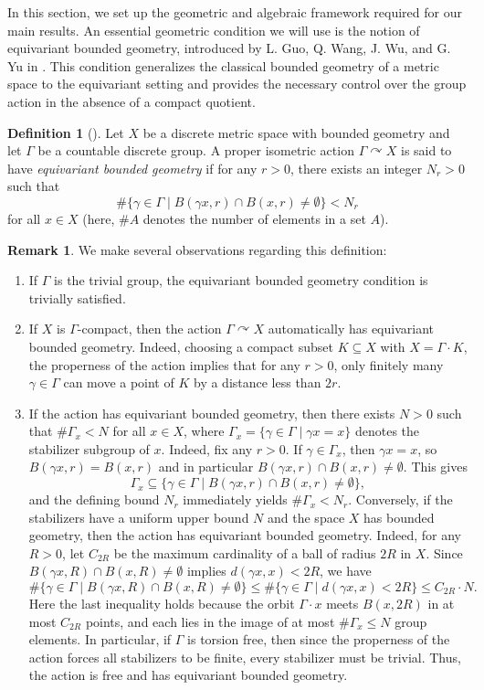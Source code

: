 \documentclass[pdflatex]{sn-jnl}
\theoremstyle{plain}
\theoremstyle{definition}
\newtheorem{definition}[theorem]{Definition}
\newtheorem{remark}[theorem]{Remark}
\begin{document}
In this section, we set up the geometric and algebraic framework required for our main results.
An essential geometric condition we will use is the notion of equivariant bounded geometry, introduced by L. Guo, Q. Wang, J. Wu, and G. Yu in \cite{GWWY24}. This condition generalizes the classical bounded geometry of a metric space to the equivariant setting and provides the necessary control over the group action in the absence of a compact quotient. 
\begin{definition}[\cite{GWWY24}]\label{def:equiv-bdd-geom}
Let $X$ be a discrete metric space with bounded geometry and let $\Gamma$ be a countable discrete group. A proper isometric action $\Gamma \curvearrowright X$ is said to have \textit{equivariant bounded geometry} if for any $r>0$, there exists an integer $N_r>0$ such that
\[\#\{\gamma\in\Gamma\mid B(\gamma x,r)\cap B(x,r)\neq\emptyset\}<N_{r}\]
for all $x\in X$ (here, $\#A$ denotes the number of elements in a set $A$).
\end{definition}
\begin{remark}\label{rem:equivariant-bounded-geometry}
We make several observations regarding this definition:
\begin{enumerate}
\item[(1)] If $\Gamma$ is the trivial group, the equivariant bounded geometry condition is trivially satisfied. 
\item [(2)] If $X$ is $\Gamma$-compact, then the action $\Gamma \curvearrowright X$ automatically has equivariant bounded geometry. Indeed, choosing a compact subset $K \subseteq X$ with $X=\Gamma\cdot K$, the properness of the action implies that for any $r>0$, only finitely many $\gamma\in\Gamma$ can move a point of $K$ by a distance less than $2r$.
\item [(3)] If the action has equivariant bounded geometry, then there exists $N>0$ such that $\#\Gamma_{x}<N$ for all $x\in X$, where $\Gamma_x=\{\gamma\in\Gamma\mid\gamma x=x\}$ denotes the stabilizer subgroup of $x$. Indeed, fix any $r>0$. If $\gamma\in\Gamma_x$, then $\gamma x=x$, so $B(\gamma x,r)=B(x,r)$ and in particular $B(\gamma x,r)\cap B(x,r)\neq\emptyset$. This gives 
\[\Gamma_x\subseteq\{\gamma \in\Gamma\mid B(\gamma x,r)\cap B(x,r)\neq\emptyset\},\]
and the defining bound $N_r$ immediately yields $\#\Gamma_x<N_r$. Conversely, if the stabilizers have a uniform upper bound $N$ and the space $X$ has bounded geometry, then the action has equivariant bounded geometry. Indeed, for any $R>0$, let $C_{2R}$ be the maximum cardinality of a ball of radius $2R$ in $X$. Since $B(\gamma x,R)\cap B(x,R)\neq\emptyset$ implies $d(\gamma x, x)<2R$, we have
\[\#\{\gamma\in\Gamma\mid B(\gamma x,R)\cap B(x,R)\neq \emptyset\}\leq\#\{\gamma\in\Gamma\mid d(\gamma x, x)<2R\}\leq C_{2R}\cdot N.\]
Here the last inequality holds because the orbit $\Gamma\cdot x$ meets $B(x,2R)$ in at most $C_{2R}$ points, and each lies in the image of at most $\#\Gamma_x\le N$ group elements.
In particular, if $\Gamma$ is torsion free, then since the properness of the action forces all stabilizers to be finite, every stabilizer must be trivial. Thus, the action is free and has equivariant bounded geometry.
\end{enumerate}
\end{remark}
\end{document}
